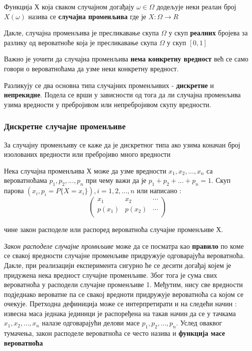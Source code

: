 \begin{de}
Функција Х која сваком случајном догађају $\omega \in \Omega $ додељује неки реалан број $X(\omega)$ назива се \textbf{случајна променљива} где је $X:\Omega \longrightarrow R $
\end{de}

Дакле, случајна променљива је пресликавање скупа $\Omega $ у скуп \textbf{реалних} бројева за разлику од вероватноће која је пресликавање скупа  
$\Omega $ у скуп $ [0,1]$

Важно је уочити да случајна променљива \textbf{нема конкретну вредност} већ се само говори о вероватноћама да узме неки конкретну вредност.

Разликују се два основна типа случајних променљивих - \textbf{дискретне} и \textbf{непрекидне}. Подела се врши у зависности од тога да ли случајна променљива узима вредности у пребројивом или непребројивом скупу вредности.



\subsubsection{Дискретне случајне променљиве}

За случајну променљиву се каже да је дискретног типа ако узима коначан број изолованих вредности или пребројиво много вредности

\begin{de}
Нека случајна променљива Х може да узме вредности $x_1,x_2, ... , x_n$ са вероватноћама $p_1,p_2, ... ,p_n$ при чему важи да је $p_1 + p_2 + ... + p_n = 1$. Скуп парова $(x_i,p_i = P\lbrace X=x_i \rbrace), i=1,2,...,n$ или написано :
$$ 
\left(
\begin{array}{ccc}
x_1 & x_2 & \cdots \\
p(x_1) & p(x_2) & \cdots \\
\end{array}
\right)
$$

чине закон расподеле  или распоред вероватноћа случајне променљиве Х.
\end{de}

\textit{Закон расподеле случајне промнљиве} може да се посматра као \textbf{правило} по коме се свакој вредности случајне променљиве придружује одговарајућа вероватноћа. Дакле, при реализацији експеримента сигурно ће се десити догађај којем је придужена нека вредност случајне променљиве. Због тога је сума свих вероватноћа у расподели случајне променљиве 1. Међутим, нису све вредности подједнако вероватне па се свакој вредноти придружује вероватноћа са којом се очекује.
Претходна дефиниција може се интерпретирати и на следећи начин : извесна маса једнака јединици је распоређена на такав начин да се у тачкама $x_1,x_2, ... , x_n$ налазе одговарајући делови масе $p_1,p_2, ... ,p_n$. Услед оваквог тумачења, закон расподеле вероватноћа се често назива и \textbf{функција масе вероватноћа}

